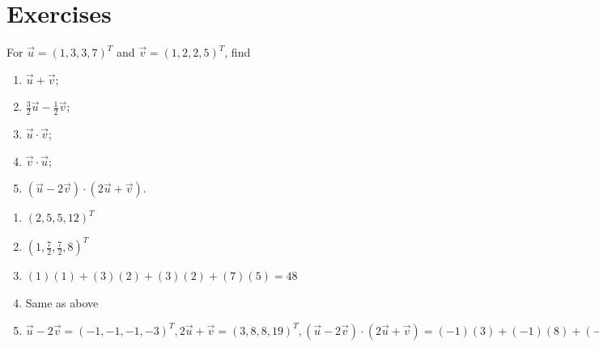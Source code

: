\section{Exercises}

\begin{Exercise}
For $\vec{u} = (1, 3, 3, 7)^T$ and $\vec{v} = (1, 2, 2, 5)^T$, find
\begin{enumerate}[label=(\alph*)]
\item $\vec{u} + \vec{v}$;
\item $\frac{3}{2}\vec{u} - \frac{1}{2}\vec{v}$;
\item $\vec{u} \cdot \vec{v}$;
\item $\vec{v} \cdot \vec{u}$;
\item $(\vec{u} - 2\vec{v}) \cdot (2\vec{u} + \vec{v})$.
\end{enumerate}
\end{Exercise}
\begin{Answer}
\begin{enumerate}[label=(\alph*)]
\item $(2, 5, 5, 12)^T$ 
\item $(1, \frac{7}{2}, \frac{7}{2}, 8)^T$
\item $(1)(1) + (3)(2) + (3)(2) + (7)(5) = 48$
\item Same as above
\item $\vec{u}-2\vec{v} = (-1, -1, -1, -3)^T, 2\vec{u} + \vec{v} = (3, 8, 8, 19)^T, (\vec{u} - 2\vec{v}) \cdot (2\vec{u} + \vec{v}) = (-1)(3) + (-1)(8) + (-1)(8) + (-3)(19) = -76$ 
\end{enumerate}
\end{Answer}

